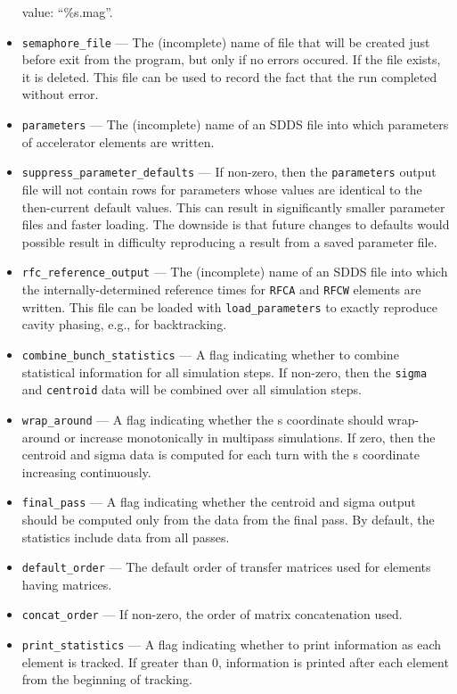 \documentclass[11pt]{article}
\begin{document}
\begin{itemize}
value: ``\%s.mag''.
\item \verb|semaphore_file| --- The (incomplete) name of file that
will be created just before exit from the program, but only if no
errors occured.  If the file exists, it is deleted.  This file can be
used to record the fact that the run completed without error.
\item \verb|parameters| --- The (incomplete) name of an SDDS file into
which parameters of accelerator elements are written.
\item \verb|suppress_parameter_defaults| --- If non-zero, then the \verb|parameters| output file
  will not contain rows for parameters whose values are identical to the then-current default values.
  This can result in significantly smaller parameter files and faster loading.
  The downside is that future changes to defaults would possible result in difficulty reproducing a
  result from a saved parameter file.
\item \verb|rfc_reference_output| --- The (incomplete) name of an SDDS file into
which the internally-determined reference times for \verb|RFCA| and \verb|RFCW| 
elements are written. This file can be loaded with \verb|load_parameters| to
exactly reproduce cavity phasing, e.g., for backtracking.
\item \verb|combine_bunch_statistics| --- A flag indicating whether to
combine statistical information for all simulation steps.  If
non-zero, then the \verb|sigma| and \verb|centroid| data will be
combined over all simulation steps.
\item \verb|wrap_around| --- A flag indicating whether the s
 coordinate should wrap-around or increase monotonically in multipass
 simulations.  If zero, then the centroid and sigma data is computed for
 each turn with the s coordinate increasing continuously.
\item \verb|final_pass| --- A flag indicating whether the centroid and
 sigma output should be computed only from the data from the final pass.
 By default, the statistics include data from all passes.
\item \verb|default_order| --- The default order of transfer matrices
used for elements having matrices.
\item \verb|concat_order| --- If non-zero, the order of matrix
concatenation used.
\item \verb|print_statistics| --- A flag indicating whether to print
information as each element is tracked. If greater than 0, information is printed after each element from the beginning of tracking.

\end{itemize}
\end{document}

